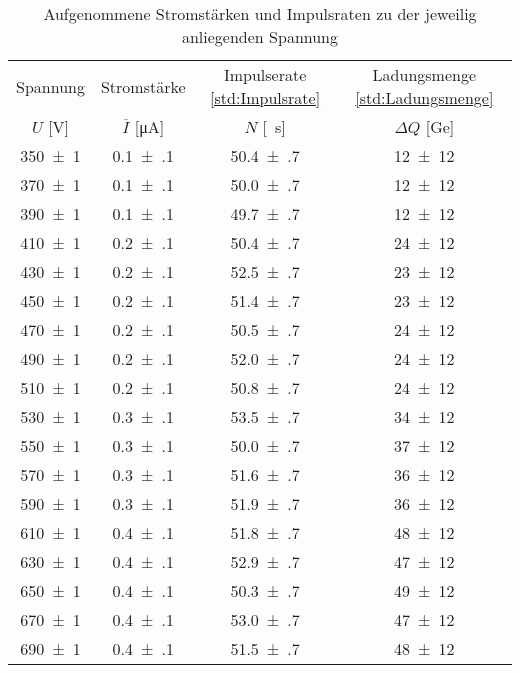 \begin{table}[!h]
	\centering
	\begin{tabular}{|c|c|c|c|}
		\hline
		Spannung & Stromstärke & Impulserate \cref{std:Impulsrate}& Ladungsmenge \cref{std:Ladungsmenge} \\
		$U$ [\si{\volt}] & $\overline{I}$ [\si{\micro\ampere}] & $N$ [\si{\per\second}] & $\Delta Q$ [\si{\giga e}]\\
\hline\hline
		\num{350(1)} & \num{0.1(1)} & \num{50.4(7)} & \num{12(12)} \\
		\num{370(1)} & \num{0.1(1)} & \num{50.0(7)} & \num{12(12)} \\
		\num{390(1)} & \num{0.1(1)} & \num{49.7(7)} & \num{12(12)} \\
		\num{410(1)} & \num{0.2(1)} & \num{50.4(7)} & \num{24(12)} \\
		\num{430(1)} & \num{0.2(1)} & \num{52.5(7)} & \num{23(12)}  \\
		\num{450(1)} & \num{0.2(1)} & \num{51.4(7)} & \num{23(12)} \\
		\num{470(1)} & \num{0.2(1)} & \num{50.5(7)} & \num{24(12)}  \\
		\num{490(1)} & \num{0.2(1)} & \num{52.0(7)} & \num{24(12)}  \\
		\num{510(1)} & \num{0.2(1)} & \num{50.8(7)} & \num{24(12)} \\
		\num{530(1)} & \num{0.3(1)} & \num{53.5(7)} & \num{34(12)} \\
		\num{550(1)} & \num{0.3(1)} & \num{50.0(7)} & \num{37(12)}\\
		\num{570(1)} & \num{0.3(1)} & \num{51.6(7)} & \num{36(12)} \\
		\num{590(1)} & \num{0.3(1)} & \num{51.9(7)} & \num{36(12)}\\
		\num{610(1)} & \num{0.4(1)} & \num{51.8(7)} & \num{48(12)}  \\
		\num{630(1)} & \num{0.4(1)} & \num{52.9(7)} & \num{47(12)}  \\
		\num{650(1)} & \num{0.4(1)} & \num{50.3(7)} & \num{49(12)} \\
		\num{670(1)} & \num{0.4(1)} & \num{53.0(7)} & \num{47(12)}\\
		\num{690(1)} & \num{0.4(1)} & \num{51.5(7)} & \num{48(12)}\\
		
		 
		\hline
	\end{tabular}
	\caption{Aufgenommene Stromstärken und Impulsraten zu der jeweilig anliegenden Spannung \label{tab:Auswertung_Ladungsmenge}}
\end{table}

















